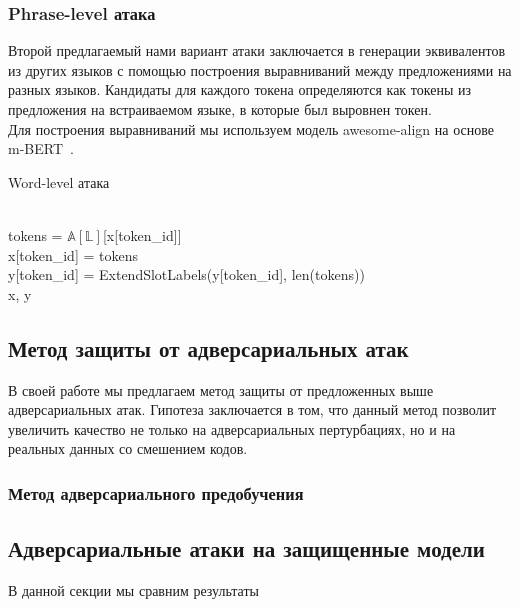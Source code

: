 
\subsubsection{Phrase-level атака}
Второй предлагаемый нами вариант атаки заключается в генерации эквивалентов из других языков с помощью построения выравниваний между предложениями на разных языков.
Кандидаты для каждого токена определяются как токены из предложения на встраиваемом языке, в которые был выровнен токен. \\
Для построения выравниваний мы используем модель awesome-align на основе m-BERT~\cite{Dou2021WordAB}.

\begin{algorithm}
    \caption{Word-level атака}
    \begin{algorithmic}
            \ind{}
                    \\
                    \ind\ind tokens = $\mathbb{A}[\mathbb{L}]$[x[token\_id]]\\
                    \ind\ind x[token\_id] = tokens\\
                    \ind\ind y[token\_id] = ExtendSlotLabels(y[token\_id], len(tokens))
            \EndIf \\
            \Return x, y
        \EndFunction
    \end{algorithmic}\label{alg:algorithm2}
\end{algorithm}


\subsection{Метод защиты от адверсариальных атак}
В своей работе мы предлагаем метод защиты от предложенных выше адверсариальных атак.
Гипотеза заключается в том, что данный метод позволит увеличить качество не только на адверсариальных пертурбациях, но и на реальных данных со смешением кодов.

\subsubsection{Метод адверсариального предобучения}

\subsection{Адверсариальные атаки на защищенные модели}
В данной секции мы сравним результаты

